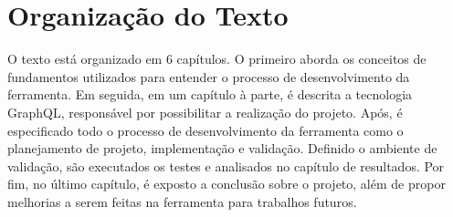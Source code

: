 \section[Organização do Texto]{Organização do Texto}

O texto está organizado em 6 capítulos. O primeiro aborda os conceitos de fundamentos utilizados para entender o processo de desenvolvimento da ferramenta. Em seguida, em um capítulo à parte, é descrita a tecnologia GraphQL, responsável por possibilitar a realização do projeto. Após, é especificado todo o processo de desenvolvimento da ferramenta como o planejamento de projeto, implementação e validação. Definido o ambiente de validação, são executados os testes e analisados no capítulo de resultados. Por fim, no último capítulo, é exposto a conclusão sobre o projeto, além de propor melhorias a serem feitas na ferramenta para trabalhos futuros.
